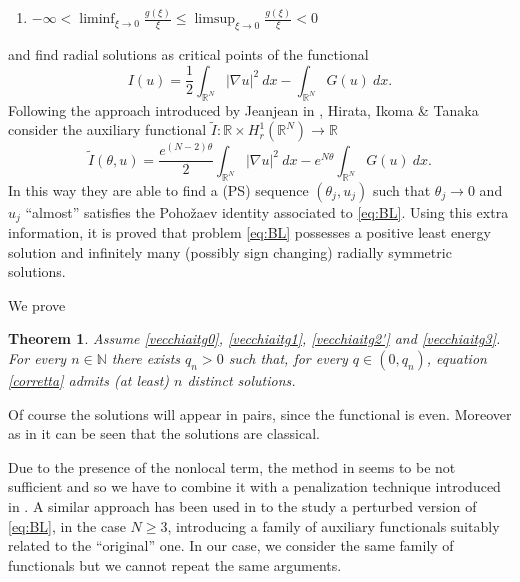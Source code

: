 \documentclass[11pt,leqno,twoside,reqno]{amsart}
\numberwithin{equation}{section}
\newtheorem{theorem}{Theorem}[section]
\begin{document}
\begin{enumerate}[label=(g\arabic*'),ref=g\arabic*',start=2]
\item \label{vecchiaitg2'}
$\displaystyle-\infty<\liminf_{\xi\to 0}\frac{g(\xi)}{\xi} {\leqslant} \limsup_{\xi\to 0}\frac{g(\xi)}{\xi}<0$
\end{enumerate}
and find radial solutions as critical points of the functional 
\[ 
I(u)=\frac{1}{2}{\int_{{\mathbb{R}^N}}} |{\nabla } u |^2\ dx - {\int_{{\mathbb{R}^N}}} G(u)\ dx.
\]
Following the approach introduced by Jeanjean in \cite{J}, Hirata, Ikoma \& Tanaka \cite{HIT} consider 
the auxiliary functional 
$\tilde{I}:{\mathbb{R}}\times H_r^1({{\mathbb{R}^N}}) \to {\mathbb{R}}$
\[
\tilde{I}({\theta},u)=\frac{e^{(N-2){\theta}}}{2}{\int_{{\mathbb{R}^N}}} |{\nabla } u |^2\ dx - e^{N{\theta}} {\int_{{\mathbb{R}^N}}} G(u)\ dx.
\]
In this way they are able to find a (PS) sequence $({\theta}_j,u_j)$ such that ${\theta}_j\to 0$ and $u_j$ ``almost'' satisfies the
Poho\v{z}aev identity associated to \eqref{eq:BL}. Using this extra information, it is proved that problem \eqref{eq:BL} 
possesses a positive least energy solution and infinitely many (possibly sign changing) radially symmetric solutions.

We prove
\begin{theorem}\label{Main}
	Assume \eqref{vecchiaitg0}, \eqref{vecchiaitg1}, \eqref{vecchiaitg2'} and \eqref{vecchiaitg3}. For every $n\in \mathbb N$ there exists $q_{n}>0$ 
	such that, for every $q\in (0,q_{n})$, equation \eqref{corretta} admits (at least) $n$ distinct solutions.
\end{theorem}

Of course the solutions will appear in pairs, since the functional is even. 
Moreover as in \cite[Proposition 2.2]{BHS} it can be seen that the solutions are classical.

Due to the presence of the nonlocal term, the method in \cite{HIT} seems to be not sufficient and so we have to combine it with a penalization 
technique introduced in \cite{BB,JC}. A similar approach has been used in \cite{ADP2} to the study a perturbed version of \eqref{eq:BL}, in 
the case $N{\geqslant} 3$, introducing a family of auxiliary functionals suitably related to the ``original'' one. In our case, we consider the same 
family of functionals but we cannot repeat the same arguments.
\end{document}
